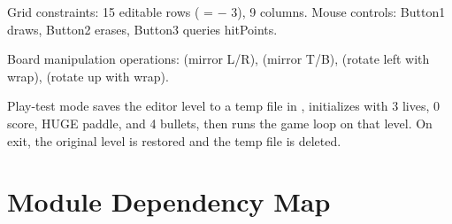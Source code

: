 \documentclass[11pt,a4paper]{article}
\begin{document}
Grid constraints: 15 editable rows ( =  $-$ 3), 9 columns. Mouse controls: Button1 draws, Button2 erases, Button3 queries hitPoints.

Board manipulation operations:  (mirror L/R),  (mirror T/B),  (rotate left with wrap),  (rotate up with wrap).

Play-test mode saves the editor level to a temp file in , initializes with 3 lives, 0 score, HUGE paddle, and 4 bullets, then runs the game loop on that level. On exit, the original level is restored and the temp file is deleted.


\section{Module Dependency Map}
\label{sec:dependencies}
\end{document}
